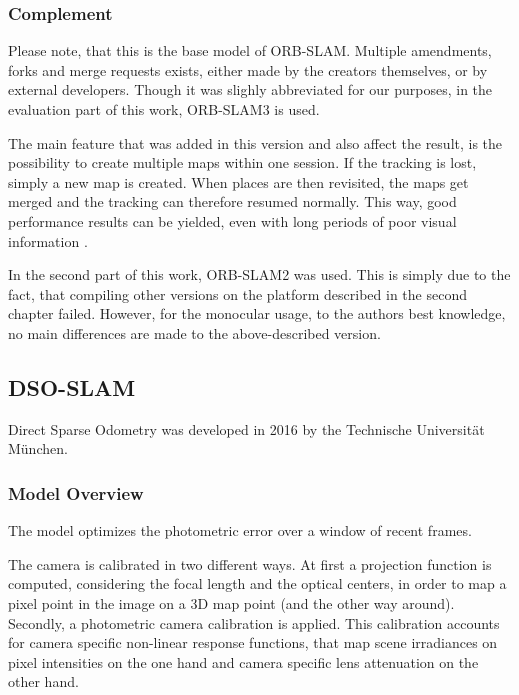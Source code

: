 	\subsubsection{Complement}\label{complement}
	
	Please note, that this is the base model of ORB-SLAM. Multiple amendments, forks and merge requests exists, either made by the creators themselves, 
	or by external developers. Though it was slighly abbreviated for our purposes, in the evaluation part of this work, ORB-SLAM3 is used. 
	
	The main feature that was added in this version and also affect the result, is the possibility to create multiple maps within one session. 
	If the tracking is lost, simply a new map is created. When places are then revisited, the maps get merged and the tracking can therefore 
	resumed normally.  This way, good performance results can be yielded, even with long periods of poor visual information \cite{orb3}. 
	
	In the second part of this work, ORB-SLAM2 was used. This is simply due to the fact, that compiling other versions on the platform described in the 
	second chapter failed. However, for the monocular usage, to the authors best knowledge, no main differences are made to the above-described version. 
	

	\subsection{DSO-SLAM}\label{dsosec}
	
	Direct Sparse Odometry was developed in 2016 by the Technische Universität München. %
	
	\subsubsection{Model Overview}\label{samemodel}
	
	The model optimizes the photometric error over a window of recent frames. 
	
	The camera is calibrated in two different ways. At first a projection function is computed, considering the focal length and the optical centers, 
	in order to map a pixel point in the image on a 3D map point (and the other way around). Secondly, a photometric camera calibration is applied. 
	This calibration accounts for camera specific non-linear response functions, that map scene irradiances on pixel intensities on the one hand and 
	camera specific lens attenuation on the other hand. 
	
